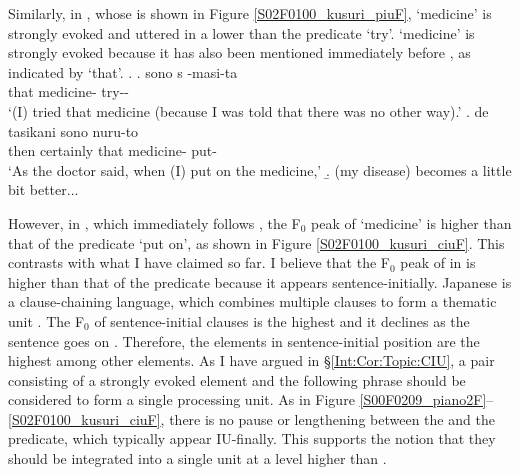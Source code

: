Similarly, in \Next[a], whose  is shown in Figure \ref{S02F0100_kusuri_piuF},
 `medicine' is strongly evoked and uttered in a lower  than the predicate  `try'.
 `medicine' is strongly evoked because
it has also been mentioned immediately before \Next[a],
as indicated by  `that'.
%
\ex.\label{S02F0100_kusuri}
 \ag. sono s  \tp{\dvline} -masi-ta \tp{\dvline} \\
       that  medicine- {} try-- {} \\
       `(I) tried that medicine (because I was told that there was no other way).'
  \bg. de \tp{\dvline} tasikani sono  nuru-to \tp{\dvline} \\
       then {} certainly that medicine- put- {} \\
       `As the doctor said, when (I) put on the medicine,'
  \b. (my disease) becomes a little bit better...

However, in \Last[b], which immediately follows \Last[a],
the F$_{0}$ peak of  `med\-i\-cine' is higher than that of the predicate  `put on',
as shown in Figure \ref{S02F0100_kusuri_ciuF}.
This contrasts with what I have claimed so far.
I believe that the F$_{0}$ peak of  in \Last[b] is higher than that of the predicate because it appears sentence-initially.
Japanese is a clause-chaining language,
which combines multiple clauses to form a thematic unit \cite{longacre85,martin92,givon01}.
The F$_{0}$ of sentence-initial clauses is the highest and it declines as the sentence goes on \cite{koisoishimoto12,ishimotokoiso12,ishimotokoiso13}.
Therefore,
the elements in sentence-initial position are the highest among other elements.
As I have argued in \S \ref{Int:Cor:Topic:CIU},
a pair consisting of a strongly evoked element and the following phrase should be considered to form a single processing unit.
As in Figure \ref{S00F0209_piano2F}--\ref{S02F0100_kusuri_ciuF},
there is no pause or  lengthening between the  and the predicate,
which typically appear IU-finally.
This supports the notion that they should be integrated into a single unit at a level higher than .



